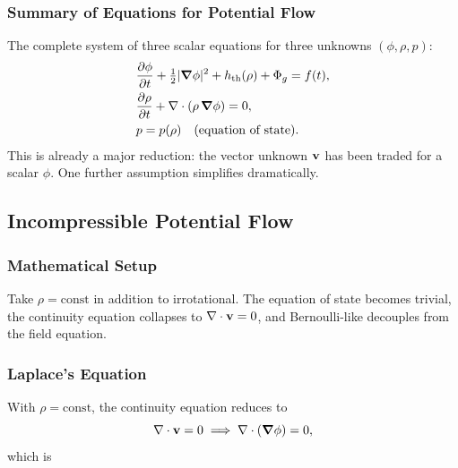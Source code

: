\documentclass[../main.tex]{subfiles}
\begin{document}

\subsubsection{Summary of Equations for Potential Flow}

The complete system of three scalar equations for three unknowns $(\phi,\rho,p)$:
\begin{align}
  &\pdv{\phi}{t} + \tfrac{1}{2}|\grad\phi|^2 + h_{\rm th}(\rho) + \Phi_g = f(t), \label{eq:lec15_sys_bern}\\
  &\pdv{\rho}{t} + \nabla \cdot(\rho\,\grad\phi) = 0, \label{eq:lec15_sys_cont}\\
  &p = p(\rho)\quad\text{(equation of state)}. \label{eq:lec15_sys_eos}
\end{align}
This is already a major reduction: the vector unknown $\mathbf{v}$ has been traded for a scalar $\phi$. One further assumption simplifies dramatically.

\subsection{Incompressible Potential Flow}\label{sec:lec15:incompressible}

\subsubsection*{Mathematical Setup}
Take $\rho=\mathrm{const}$ in addition to irrotational. The equation of state becomes trivial, the continuity equation collapses to $\nabla \cdot\mathbf{v}=0$, and Bernoulli-like decouples from the field equation.

\subsubsection{Laplace's Equation}

With $\rho=\mathrm{const}$, the continuity equation reduces to
\begin{equation}
  \nabla \cdot\mathbf{v} = 0 \;\Longrightarrow\; \nabla \cdot(\grad\phi)=0,
  \label{eq:lec15_cont_inc}
\end{equation}
which is
\end{document}
